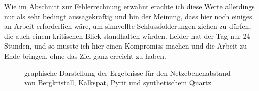 Wie  im  Abschnitt  zur  Fehlerrechnung  erw\"ahnt  erachte  ich  diese  Werte
allerdings  nur  als  sehr  bedingt  aussagekr\"aftig  und  bin  der  Meinung,
dass  hier  noch   einiges  an  Arbeit  erforderlich   w\"are,  um  sinnvollte
Schlussfolderungen  ziehen  zu  d\"urfen,  die  auch  einem  kritischen  Blick
standhalten w\"urden. Leider  hat der Tag  nur 24  Stunden, und so  musste ich
hier einen  Kompromiss machen und  die Arbeit zu  Ende bringen, ohne  das Ziel
ganz erreicht zu haben.


\pgfplotsset{try min ticks = 4}
\begin{figure}[ht!]
    \centering
    \caption{graphische Darstellung der Ergebnisse f\"ur den Netzebenenabstand von Bergkristall, Kalkspat, Pyrit und synthetischem Quartz }
    \label{fig:resultsOtherCrystals}
\end{figure}

